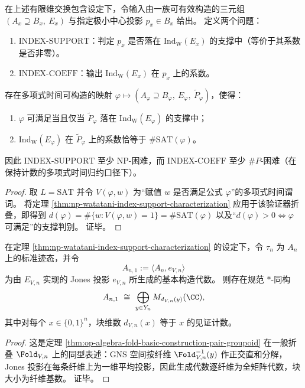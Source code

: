 \begin{definition}[指数支撑判别与系数读出]\label{def:index-support-and-coeff-problems}
在上述有限维交换包含设定下，令输入由一族可有效构造的三元组 \((A_x\supseteq B_x,\ E_x)\) 与指定极小中心投影 \(p_x\in B_x\) 给出。
定义两个问题：
\begin{enumerate}
\normalfont
  \item \(\mathrm{INDEX\text{-}SUPPORT}\)：判定 \(p_x\) 是否落在 \(\mathrm{Ind}_{\mathrm W}(E_x)\) 的支撑中（等价于其系数是否非零）。
  \item \(\mathrm{INDEX\text{-}COEFF}\)：输出 \(\mathrm{Ind}_{\mathrm W}(E_x)\) 在 \(p_x\) 上的系数。
\end{enumerate}
\end{definition}

\begin{corollary}\label{cor:index-support-sat-np-hard-index-coeff-sharpP}
存在多项式时间可构造的映射 \(\varphi\mapsto(A_\varphi\supseteq B_\varphi,\ E_\varphi,\ \widetilde P_\varphi)\)，使得：
\begin{enumerate}
\normalfont
  \item \(\varphi\) 可满足当且仅当 \(\widetilde P_\varphi\) 落在 \(\mathrm{Ind}_{\mathrm W}(E_\varphi)\) 的支撑中；
  \item \(\mathrm{Ind}_{\mathrm W}(E_\varphi)\) 在 \(\widetilde P_\varphi\) 上的系数恰等于 \(\#\mathrm{SAT}(\varphi)\)。
\end{enumerate}
因此 \(\mathrm{INDEX\text{-}SUPPORT}\) 至少 NP-困难，而 \(\mathrm{INDEX\text{-}COEFF}\) 至少 \(\#P\)-困难（在保持计数的多项式时间归约口径下）。
\end{corollary}
\begin{proof}
取 \(L=\mathrm{SAT}\) 并令 \(V(\varphi,w)\) 为“赋值 \(w\) 是否满足公式 \(\varphi\)”的多项式时间谓词。
将定理 \ref{thm:np-watatani-index-support-characterization} 应用于该验证器折叠，即得到
\(
d(\varphi)=\#\{w:V(\varphi,w)=1\}=\#\mathrm{SAT}(\varphi)
\)
以及“\(d(\varphi)>0\iff\varphi\) 可满足”的支撑判别。
证毕。
\end{proof}

\begin{theorem}\label{thm:np-jones-basic-construction-witness-blocks}
在定理 \ref{thm:np-watatani-index-support-characterization} 的设定下，令 \(\tau_n\) 为 \(A_n\) 上的标准迹态，并令
\[
A_{n,1}:=\langle A_n,e_{V,n}\rangle
\]
为由 \(E_{V,n}\) 实现的 Jones 投影 \(e_{V,n}\) 所生成的基本构造代数。
则存在规范 \(\ast\)-同构
\[
A_{n,1}\ \cong\ \bigoplus_{y\in Y_n} M_{d_{V,n}(y)}(\CC),
\]
其中对每个 \(x\in\{0,1\}^n\)，块维数 \(d_{V,n}(x)\) 等于 \(x\) 的见证计数。
\end{theorem}
\begin{proof}
这是定理 \ref{thm:op-algebra-fold-basic-construction-pair-groupoid} 在一般折叠 \(\Fold_{V,n}\) 上的同型表述：GNS 空间按纤维 \(\Fold_{V,n}^{-1}(y)\) 作正交直和分解，Jones 投影在每条纤维上为一维平均投影，因此生成代数逐纤维为全矩阵代数，块大小为纤维基数。
证毕。
\end{proof}

